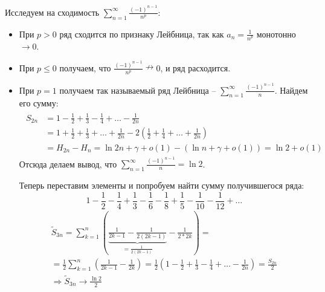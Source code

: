 \begin{example}
    Исследуем на сходимость $\sum\limits_{n=1}^\infty \frac{(-1)^{n-1}}{n^p}$:
    \begin{itemize}
        \item При $p > 0$ ряд сходится по признаку Лейбница, так как $a_n = \frac{1}{n^p}$ монотонно $\to 0$.
        \item При $p \leqslant 0$ получаем, что $\frac{(-1)^{n-1}}{n^p} \nrightarrow 0$, и ряд расходится.
        \item При $p = 1$ получаем так называемый ряд Лейбница -- $\sum\limits_{n = 1}^\infty \frac{(-1)^{n-1}}{n}$. Найдем его сумму:
        \begin{gather*}
            \begin{split}
                S_{2n} &= 1 - \frac{1}{2} + \frac{1}{3} - \frac{1}{4} + \dots - \frac{1}{2n} \\
                &= 1 + \frac{1}{2} + \frac{1}{3} + \dots + \frac{1}{2n} - 2(\frac{1}{2} + \frac{1}{4} + \dots + \frac{1}{2n}) \\
                &= H_{2n} - H_n = \ln 2n + \gamma + o(1) - (\ln n + \gamma + o(1)) = \ln 2 + o(1)
            \end{split}
        \end{gather*}
        Отсюда делаем вывод, что $\sum\limits_{n = 1}^\infty \frac{(-1)^{n-1}}{n} = \ln 2$.
        
        Теперь переставим элементы и попробуем найти сумму получившегося ряда: \[ 1 - \frac{1}{2} - \frac{1}{4} + \frac{1}{3} - \frac{1}{6} - \frac{1}{8} + \frac{1}{5} - \frac{1}{10} - \frac{1}{12} + \dots \]
        \begin{gather*}
            \widetilde{S}_{3n} = \sum_{k = 1}^n \left(\underbrace{\frac{1}{2k - 1} - \frac{1}{2(2k - 1)}}_{= \frac{1}{2(2k - 1)}} - \frac{1}{2 * 2k}\right) = \\ 
            =  \frac{1}{2}\sum_{k = 1}^n \left(\frac{1}{2k - 1} - \frac{1}{2k}\right) = \frac{1}{2}\left(1 - \frac{1}{2} + \frac{1}{3} - \frac{1}{4} + \dots - \frac{1}{2n}\right) = \frac{S_{2n}}{2} \\
            \Rightarrow \widetilde{S}_{3n} \to \frac{\ln 2}{2}
        \end{gather*}
        
    \end{itemize}
\end{example}